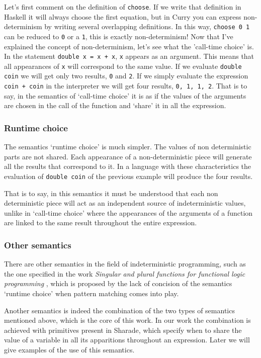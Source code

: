 \documentclass[class=article, crop=false]{standalone}
\begin{document}
Let's first comment on the definition of \verb`choose`. If we write that definition in
Haskell it will always choose the first equation, but in Curry you can express
non-determinism by writing several overlapping definitions. In this way, \verb`choose 0 1`
can be reduced to \verb`0` or a \verb`1`, this is exactly non-determinism! Now that
I've explained the concept of non-determinism, let's see what the 'call-time choice' is. In
the statement \verb`double x = x + x`, \verb`x` appears as an argument. This means that all
appearances of \verb`x` will correspond to the same value. If we evaluate \verb`double coin`
we will get only two results, \verb`0` and \verb`2`. If we simply evaluate the expression 
\verb`coin + coin` in the interpreter we will get four results, \verb`0, 1, 1, 2`. That is to
say, in the semantics of `call-time choice' it is as if the values of the arguments are
chosen in the call of the function and `share' it in all the expression.

\subsubsection{Runtime choice}
The semantics `runtime choice' is much simpler. The values of non deterministic parts are not
shared. Each appearance of a non-deterministic piece will generate all the results that
correspond to it. In a language with these characteristics the evaluation of
\verb`double coin` of the previous example will produce the four results.

That is to say, in this semantics it must be understood that each non deterministic piece
will act as an independent source of indeterministic values, unlike in `call-time choice'
where the appearances of the arguments of a function are linked to the same result throughout
the entire expression.

\subsubsection{Other semantics}
There are other semantics in the field of indeterministic programming, such as the one
specified in the work \textit{Singular and plural functions for functional logic programming}
\cite{riesco2014singular}, which is proposed by the lack of concision of the semantics
`runtime choice' when pattern matching comes into play.

Another semantics is indeed the combination of the two types of semantics mentioned above,
which is the core of this work. In our work the combination is achieved with primitives
present in Sharade, which specify when to share the value of a variable in all its
apparitions throughout an expression. Later we will give examples of the use of this
semantics.
\end{document}

